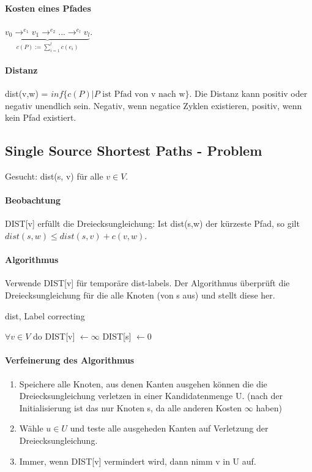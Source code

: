\paragraph{Kosten eines Pfades} $\underbrace{v_0 \rightarrow^{e_1} v_1 \rightarrow^{e_2} ... \rightarrow^{e_l} v_l}_{c(P):= \sum^{l}_{i=1}c(e_i)}$. 

\paragraph{Distanz} dist(v,w) = $ inf\{ c(P) | P \text{ ist Pfad von v nach w} \}$. Die Distanz kann positiv oder negativ unendlich sein. Negativ, wenn negatice Zyklen existieren, positiv, wenn kein Pfad existiert.

\subsection{Single Source Shortest Paths - Problem}
Gesucht: dist(s, v)  für alle $v\in V$.
\paragraph{Beobachtung} DIST[v] erfüllt die Dreiecksungleichung: Ist dist(s,w) der kürzeste Pfad, so gilt $dist(s,w) \leq dist(s,v) + c(v,w)$.

\paragraph{Algorithmus} Verwende DIST[v] für temporäre dist-labels. Der Algorithmus überprüft die Dreiecksungleichung für die alle Knoten (von s aus) und stellt diese her.

\begin{algorithm}[H]
\caption{dist, Label correcting}
$\forall v\in V $ do DIST[v] $\gets \infty$ \;
DIST[s] $\gets 0$ \;

\end{algorithm}

\paragraph{Verfeinerung des Algorithmus}
\begin{enumerate}
    \item Speichere alle Knoten, aus denen Kanten ausgehen können die die Dreiecksungleichung verletzen in einer Kandidatenmenge U. (nach der Initialisierung ist das nur Knoten s, da alle anderen Kosten $\infty$ haben)
    \item Wähle $u \in U$ und teste alle ausgeheden Kanten auf Verletzung der Dreiecksungleichung.
    \item Immer, wenn DIST[v] vermindert wird, dann nimm v in U auf.
\end{enumerate}

